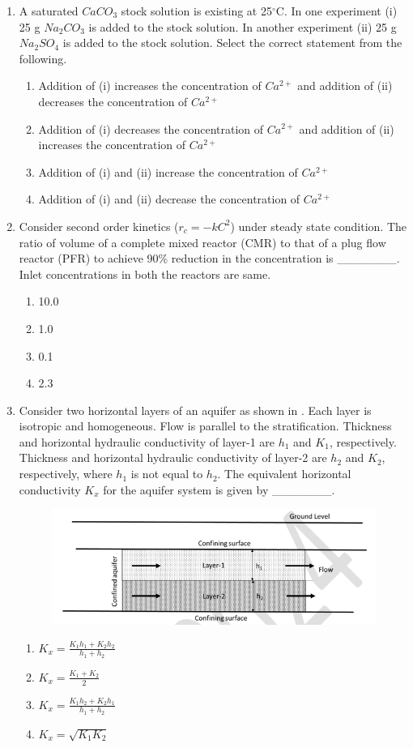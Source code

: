 \documentclass[journal]{IEEEtran}
\begin{document}
\begin{enumerate}
\item A saturated $CaCO_{3}$ stock solution is existing at 25$^{\circ}$C. In one experiment (i) 25 g $Na_{2}CO_{3}$ is added to the stock solution. In another experiment (ii) 25 g $Na_{2}SO_{4}$ is added to the stock solution. Select the correct statement from the following.
\hfill{}
\begin{enumerate}
\item Addition of (i) increases the concentration of $Ca^{2+}$ and addition of (ii) decreases the concentration of $Ca^{2+}$
\item Addition of (i) decreases the concentration of $Ca^{2+}$ and addition of (ii) increases the concentration of $Ca^{2+}$
\item Addition of (i) and (ii) increase the concentration of $Ca^{2+}$
\item Addition of (i) and (ii) decrease the concentration of $Ca^{2+}$
\end{enumerate}

\item Consider second order kinetics ($r_{c} = -kC^2$) under steady state condition. The ratio of volume of a complete mixed reactor (CMR) to that of a plug flow reactor (PFR) to achieve 90\% reduction in the concentration is \_\_\_\_\_\_\_. Inlet concentrations in both the reactors are same.
\hfill{}
\begin{enumerate}
\item 10.0
\item 1.0
\item 0.1
\item 2.3
\end{enumerate}

\item Consider two horizontal layers of an aquifer as shown in . Each layer is isotropic and homogeneous. Flow is parallel to the stratification. Thickness and horizontal hydraulic conductivity of layer-1 are $h_{1}$ and $K_{1}$, respectively. Thickness and horizontal hydraulic conductivity of layer-2 are $h_{2}$ and $K_{2}$, respectively, where $h_{1}$ is not equal to $h_{2}$. The equivalent horizontal conductivity $K_{x}$ for the aquifer system is given by \_\_\_\_\_\_\_.
\hfill{}
\begin{figure}[H]
    \centering
    \includegraphics[width=0.5\linewidth]{figs/fig8.png}
    \caption{}
    \label{fig8}
\end{figure}
\begin{enumerate}
\item $K_{x} = \frac{K_{1} h_{1} + K_{2} h_{2}}{h_{1} + h_{2}}$
\item $K_{x} = \frac{K_{1} + K_{2}}{2}$
\item $K_{x} = \frac{K_{1} h_{2} + K_{2} h_{1}}{h_{1} + h_{2}}$
\item $K_{x} = \sqrt{K_{1}K_{2}}$
\end{enumerate}


\end{enumerate}
\end{document}
